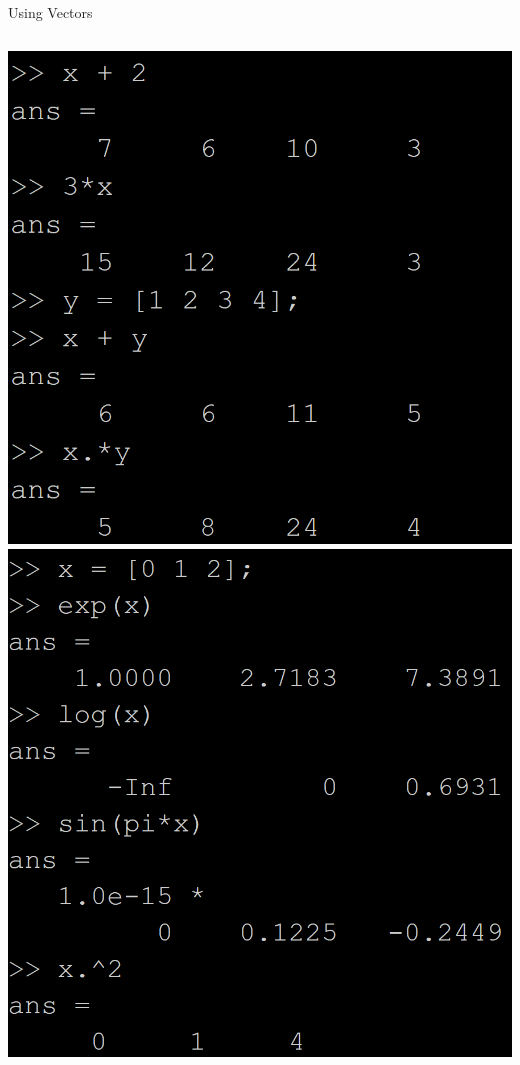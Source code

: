 {}\documentclass[letterpaper,
compress,
xcolor=x11names,
]{beamer}
\begin{document}
\begin{frame}{Using Vectors}
\begin{columns}
\begin{column}{0.25\linewidth}
			\includegraphics[width = \linewidth]{vector_arithmetic.png}
			\includegraphics[width = \linewidth]{vector_functions.png}
		\end{column}
	\end{columns}
\end{frame}
\end{document}
